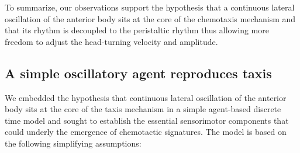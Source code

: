 \documentclass[10pt,a4paper]{article}
\begin{document}
To summarize, our observations support the hypothesis that a continuous lateral oscillation of the anterior body sits at the core of the chemotaxis mechanism and that its rhythm is decoupled to the peristaltic rhythm thus allowing more freedom to adjust the head-turning velocity and amplitude.


\subsection{A simple oscillatory agent reproduces taxis}
We embedded the hypothesis that continuous lateral oscillation of the anterior body sits at the core of the taxis mechanism in a simple agent-based discrete time model and sought to establish the essential sensorimotor components that could underly the emergence of chemotactic signatures. The model is based on the following simplifying assumptions:
\end{document}
